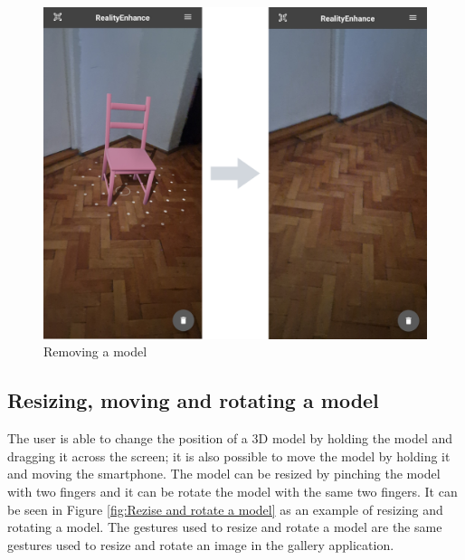 \begin{figure}[ht]
    \begin{center}
        \includegraphics[width=1\textwidth]{img/App_screenshots/Model-removed.png}
        \caption{Removing a model}
        \label{fig:remove-a-model}
    \end{center}
\end{figure}

\pagebreak

\subsection{Resizing, moving and rotating a model}
The user is able to change the position of a \ac{3D} model by holding the model and dragging it across the screen; it is also possible to move the model by holding it and moving the smartphone.  The model can be resized by pinching the model with two fingers and it can be rotate the model with the same two fingers. It can be seen in Figure \ref{fig:Rezise and rotate a model} as an example of resizing and rotating a model. The gestures used to resize and rotate a model are the same gestures used to resize and rotate an image in the gallery application.

